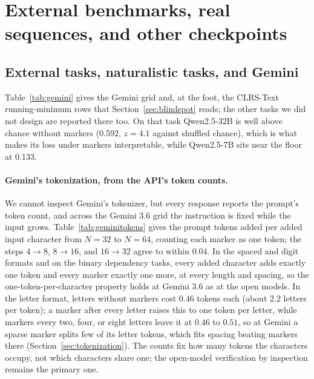 \documentclass[10pt]{article} %
\newcommand{\task}[1]{\texttt{#1}}
\begin{document}
\FloatBarrier
\section{External benchmarks, real sequences, and other checkpoints}

\subsection{External tasks, naturalistic tasks, and Gemini}
\label{app:external}

Table~\ref{tab:gemini} gives the Gemini grid and, at the foot, the CLRS-Text running-minimum rows that Section~\ref{sec:blindspot} reads; the other tasks we did not design are reported there too. On that task Qwen2.5-32B is well above chance without markers (0.592, $z = 4.1$ against shuffled chance), which is what makes its loss under markers interpretable, while Qwen2.5-7B sits near the floor at 0.133.

\begin{table}[!htbp]
\centering
\small
\caption{Closed-model check and CLRS-Text. Gemini 3.5 Flash (3 trials per cell, letter and dependency tasks, pooled over all tested lengths, including $N$ up to 256 for \task{cyclic\_shift}) and Gemini 3.6 Flash (5 trials per cell, all 13 task--format variants, $N \le 64$), with the no-marker mean length-matched. The CLRS-Text rows cover Qwen2.5-7B and 32B as well as Gemini 3.5, and use token-level markers and scoring. The $|z|$ values are the fixed-strata ones used throughout, which is why they differ from a generation-level estimate.}
\label{tab:gemini}

\end{table}

\paragraph{Gemini's tokenization, from the API's token counts.} We cannot inspect Gemini's tokenizer, but every response reports the prompt's token count, and across the Gemini 3.6 grid the instruction is fixed while the input grows. Table~\ref{tab:geminitokens} gives the prompt tokens added per added input character from $N = 32$ to $N = 64$, counting each marker as one token; the steps $4 \to 8$, $8 \to 16$, and $16 \to 32$ agree to within $0.04$. In the spaced and digit formats and on the binary dependency tasks, every added character adds exactly one token and every marker exactly one more, at every length and spacing, so the one-token-per-character property holds at Gemini 3.6 as at the open models. In the letter format, letters without markers cost $0.46$ tokens each (about 2.2 letters per token); a marker after every letter raises this to one token per letter, while markers every two, four, or eight letters leave it at $0.46$ to $0.51$, so at Gemini a sparse marker splits few of its letter tokens, which fits spacing beating markers there (Section~\ref{sec:tokenization}). The counts fix how many tokens the characters occupy, not which characters share one; the open-model verification by inspection remains the primary one.
\end{document}
